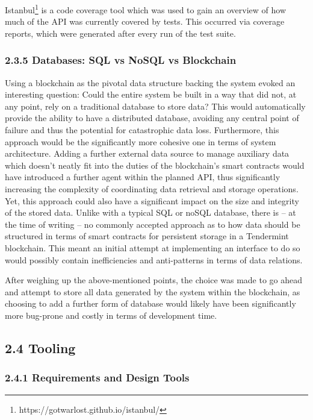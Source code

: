 \documentclass[12pt]{report}
\begin{document}
Istanbul\footnote{https://gotwarlost.github.io/istanbul/} is a
code coverage tool which was used to gain an overview of how much of the
API was currently covered by tests. This occurred via coverage reports,
which were generated after every run of the test suite.

\subsubsection{2.3.5 Databases: SQL vs NoSQL vs
Blockchain}\label{databases-sql-vs-nosql-vs-blockchain}

Using a blockchain as the pivotal data structure backing the system
evoked an interesting question: Could the entire system be built in a
way that did not, at any point, rely on a traditional database to store
data? This would automatically provide the ability to have a distributed
database, avoiding any central point of failure and thus the potential
for catastrophic data loss. Furthermore, this approach would be the
significantly more cohesive one in terms of system architecture. Adding
a further external data source to manage auxiliary data which doesn't
neatly fit into the duties of the blockchain's smart contracts would
have introduced a further agent within the planned API, thus
significantly increasing the complexity of coordinating data retrieval
and storage operations.\\
Yet, this approach could also have a significant impact on the size and
integrity of the stored data. Unlike with a typical SQL or noSQL
database, there is -- at the time of writing -- no commonly accepted
approach as to how data should be structured in terms of smart contracts
for persistent storage in a Tendermint blockchain. This meant an initial
attempt at implementing an interface to do so would possibly contain
inefficiencies and anti-patterns in terms of data relations.

After weighing up the above-mentioned points, the choice was made to go
ahead and attempt to store all data generated by the system within the
blockchain, as choosing to add a further form of database would likely
have been significantly more bug-prone and costly in terms of
development time.

\subsection{2.4 Tooling}\label{tooling}

\subsubsection{2.4.1 Requirements and Design
Tools}\label{requirements-and-design-tools}
\end{document}
